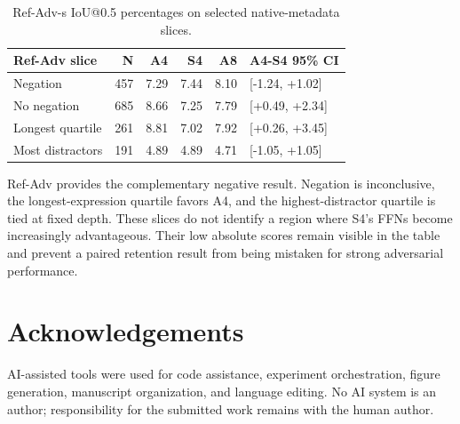\documentclass[10pt]{article}
\begin{document}
\begin{table}[H]
\centering
\small
\begin{tabular}{lrrrrl}
\toprule
Ref-Adv slice & N & A4 & S4 & A8 & A4-S4 95\% CI \\
\midrule
Negation & 457 & 7.29 & 7.44 & 8.10 & [-1.24, +1.02] \\
No negation & 685 & 8.66 & 7.25 & 7.79 & [+0.49, +2.34] \\
Longest quartile & 261 & 8.81 & 7.02 & 7.92 & [+0.26, +3.45] \\
Most distractors & 191 & 4.89 & 4.89 & 4.71 & [-1.05, +1.05] \\
\bottomrule
\end{tabular}
\caption{Ref-Adv-s IoU@0.5 percentages on selected native-metadata slices.}
\label{tab:refadv-slices}
\end{table}

Ref-Adv provides the complementary negative result. Negation is inconclusive,
the longest-expression quartile favors A4, and the highest-distractor quartile
is tied at fixed depth. These slices do not identify a region where S4's FFNs
become increasingly advantageous. Their low absolute scores remain visible in
the table and prevent a paired retention result from being mistaken for strong
adversarial performance.

\section*{Acknowledgements}

AI-assisted tools were used for code assistance, experiment orchestration,
figure generation, manuscript organization, and language editing. No AI system
is an author; responsibility for the submitted work remains with the human
author.

\clearpage

\end{document}
